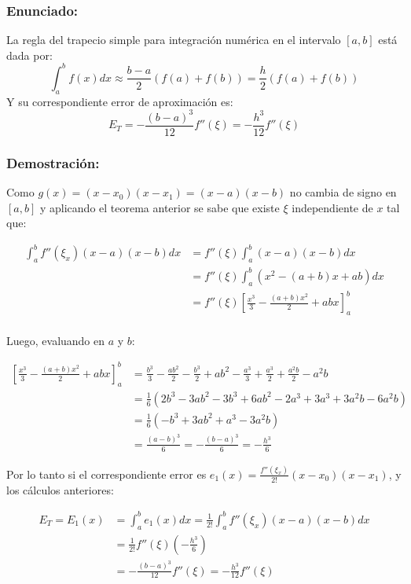 \documentclass[a4paper,12pt]{article}
\begin{document}
\subsubsection{Enunciado:}
La regla del trapecio simple para integración numérica en el intervalo $[a,b]$ está dada por:
\[
\int_a^b f(x)dx \approx \frac{b-a}{2}(f(a)+f(b))=\frac{h}{2}(f(a)+f(b))
\]
 Y su correspondiente error de aproximación es:
\[
E_T=-\frac{(b-a)^3}{12}f''(\xi)=-\frac{h^3}{12}f''(\xi)
\]
\subsubsection{Demostración:}
Como $g(x)=(x-x_0)(x-x_1)=(x-a)(x-b)$ no cambia de signo en $[a,b]$ y aplicando el teorema anterior se sabe que existe $\xi$ independiente de $x$ tal que:

\begin{align*}
    \int_a^b f''(\xi_x)(x-a)(x-b)dx &= f''(\xi)\int_a^b (x-a)(x-b)dx \\
    &= f''(\xi)\int_a^b (x^2-(a+b)x+ab)dx \\
    &= f''(\xi)\left[\frac{x^3}{3}-\frac{(a+b)x^2}{2}+abx\right]_a^b \\
\end{align*}

Luego, evaluando en $a$ y $b$:

\begin{align*}
    \left[\frac{x^3}{3}-\frac{(a+b)x^2}{2}+abx\right]_a^b &= \frac{b^3}{3} - \frac{ab^2}{2} - \frac{b^3}{2} + ab^2 - \frac{a^3}{3} + \frac{a^3}{2} + \frac{a^2 b}{2}-a^2b\\
    &= \frac{1}{6}(2b^3 - 3ab^2 - 3b^3 + 6ab^2 - 2a^3 + 3a^3 + 3a^2b - 6a^2b) \\
    &= \frac{1}{6}(-b^3 + 3ab^2 + a^3 - 3a^2b) \\
    &= \frac{(a-b)^3}{6}= -\frac{(b-a)^3}{6}= -\frac{h^3}{6}
\end{align*}

Por lo tanto si el correspondiente error es $e_1(x)=\frac{f''(\xi_x)}{2!}(x-x_0)(x-x_1)$, y los cálculos anteriores:

\begin{align*}
    E_T=E_1(x) &= \int_a^b e_1(x)dx =\frac{1}{2!} \int_a^b f''(\xi_x)(x-a)(x-b)dx \\
    &= \frac{1}{2!}f''(\xi)\left( -\frac{h^3}{6} \right)\\
    &= -\frac{(b-a)^3}{12}f''(\xi) = -\frac{h^3}{12}f''(\xi)
\end{align*}
\end{document}
